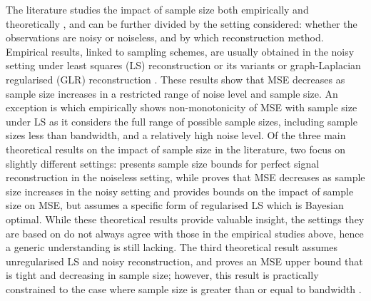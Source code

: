The literature studies the impact of sample size both empirically and theoretically , and can be further divided by the setting considered: whether the observations are noisy or noiseless, and by which reconstruction method. Empirical results, linked to sampling schemes, are usually obtained in the noisy setting under least squares (LS) reconstruction or its variants \cite{ tremblay2017determinantal,wang2018optimal,wang2019low,chamon2017greedy} or graph-Laplacian regularised (GLR) reconstruction \cite{bai2020fast, tremblay2017determinantal}. These results show that MSE decreases as sample size increases in a restricted range of noise level and sample size. An exception is \cite[Fig. 1]{anis2016efficient} which empirically shows non-monotonicity of MSE with sample size under LS as it considers the {\color{black}full range of possible sample sizes, including sample sizes less than bandwidth,} and a relatively high noise level. Of the three main theoretical results on the impact of sample size in the literature, two focus on slightly different settings: \cite{shomorony2014sampling} presents sample size bounds for perfect signal reconstruction in the noiseless setting, while \cite[]{chamon2017greedy} proves that MSE decreases as sample size increases in the noisy setting and provides bounds on the impact of sample size on MSE, but assumes a specific form of regularised LS which is Bayesian optimal. While these theoretical results provide valuable insight, the settings they are based on do not always agree with those in the empirical studies above, hence a generic understanding is still lacking. The third theoretical result \cite[Theorem 6]{puy2018random} assumes unregularised LS and noisy reconstruction, and proves an MSE upper bound that is tight and decreasing in sample size; however, this result is practically constrained to the case where sample size is greater than or equal to bandwidth \cite[Eq. 3]{puy2018random}.
\fi

